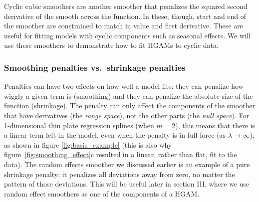 \documentclass[12pt]{article}
\begin{document}
Cyclic cubic smoothers are another smoother that penalizes the squared
second derivative of the smooth across the function. In these, though,
start and end of the smoother are constrained to match in value and
first derivative. These are useful for fitting models with cyclic
components such as seasonal effects. We will use these smoothers to
demonstrate how to fit HGAMs to cyclic data.

\subsubsection{Smoothing penalties vs.~shrinkage
penalties}\label{smoothing-penalties-vs.shrinkage-penalties}

Penalties can have two effects on how well a model fits: they can
penalize how wiggly a given term is (smoothing) and they can penalize
the absolute size of the function (shrinkage). The penalty can only
affect the components of the smoother that have derivatives (the
\emph{range space}), not the other parts (the \emph{null space}). For
1-dimensional thin plate regression splines (when \(m=2\)), this means
that there is a linear term left in the model, even when the penalty is
in full force (as \(\lambda \rightarrow \infty\)), as shown in figure
\ref{fig:basis_example} (this is also why
figure~\ref{fig:smoothing_effect}c resulted in a linear, rather than
flat, fit to the data). The random effects smoother we discussed earlier
is an example of a pure shrinkage penalty; it penalizes all deviations
away from zero, no matter the pattern of those deviations. This will be
useful later in section III, where we use random effect smoothers as one
of the components of a HGAM.
\end{document}
